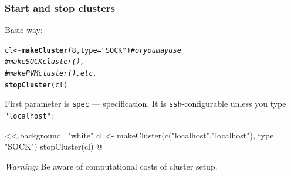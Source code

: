 \documentclass[aspectratio=169]{beamer}\usepackage[]{graphicx}\usepackage[]{color}
\makeatletter
\newcommand{\hlnum}[1]{\textcolor[rgb]{0.686,0.059,0.569}{#1}}%
\newcommand{\hlstr}[1]{\textcolor[rgb]{0.192,0.494,0.8}{#1}}%
\newcommand{\hlcom}[1]{\textcolor[rgb]{0.678,0.584,0.686}{\textit{#1}}}%
\newcommand{\hlstd}[1]{\textcolor[rgb]{0.345,0.345,0.345}{#1}}%
\newcommand{\hlkwb}[1]{\textcolor[rgb]{0.69,0.353,0.396}{#1}}%
\newcommand{\hlkwc}[1]{\textcolor[rgb]{0.333,0.667,0.333}{#1}}%
\newcommand{\hlkwd}[1]{\textcolor[rgb]{0.737,0.353,0.396}{\textbf{#1}}}%
\newenvironment{kframe}{%
 \def\at@end@of@kframe{}%
 \ifinner\ifhmode%
  \def\at@end@of@kframe{\end{minipage}}%
  \begin{minipage}{\columnwidth}%
 \fi\fi%
 \def\FrameCommand##1{\hskip\@totalleftmargin \hskip-\fboxsep
 \colorbox{shadecolor}{##1}\hskip-\fboxsep
     \hskip-\linewidth \hskip-\@totalleftmargin \hskip\columnwidth}%
 \MakeFramed {\advance\hsize-\width
   \@totalleftmargin\z@ \linewidth\hsize
   \@setminipage}}%
 {\par\unskip\endMakeFramed%
 \at@end@of@kframe}
\newenvironment{knitrout}{}{} %
\makeatother
\begin{document}
\begin{frame}[fragile]
    \frametitle{Start and stop clusters}
    
    Basic way:
\begin{knitrout}
\color{fgcolor}\begin{kframe}
\begin{alltt}
  \hlstd{cl} \hlkwb{<-} \hlkwd{makeCluster}\hlstd{(}\hlnum{8}\hlstd{,} \hlkwc{type} \hlstd{=} \hlstr{"SOCK"}\hlstd{)} \hlcom{# or you may use }
                                      \hlcom{# makeSOCKcluster(), }
                                      \hlcom{# makePVMcluster(), etc.}
  \hlkwd{stopCluster}\hlstd{(cl)}
\end{alltt}
\end{kframe}
\end{knitrout}

  First parameter is \texttt{spec} --- specification. It is \texttt{ssh}-configurable unless you type \texttt{"localhost"}:
  
  
<<,background="white"
  cl <- makeCluster(c("localhost","localhost"), type = "SOCK")
  stopCluster(cl)
@

{\color{blue} \textit{Warning:} Be aware of computational costs of cluster setup.}
\end{frame}
\end{document}
